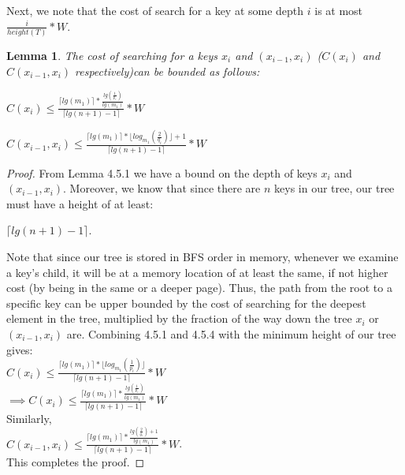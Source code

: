 \documentclass[letterpaper,12pt,titlepage,oneside,final]{book}
\theoremstyle{plain}
\newtheorem{lem}[thm]{Lemma}
\begin{document}
Next, we note that the cost of search for a key at some depth $i$ is at most $\frac{i}{height(T)}* W$.

\begin{lem}
The cost of searching for a keys $x_i$ and $(x_{i-1},x_i)$ ($C(x_i)$ and $C(x_{i-1},x_i)$ respectively)can be bounded as follows: 

\begin{center} $C(x_i) \leq \frac{\lceil lg(m_1) \rceil * \frac{lg(\frac{1}{p_i})}{lg(m_1)}}{\lceil lg(n+1) - 1 \rceil} * W$ 
\end{center}


\begin{center}
 $C(x_{i-1},x_i) \leq \frac{\lceil lg(m_1) \rceil * \lfloor log_{m_1}(\frac{2}{q_i}) \rfloor + 1}{\lceil lg(n+1) - 1 \rceil} * W$ 
 \end{center}
\end{lem}

\begin{proof}
From Lemma 4.5.1 we have a bound on the depth of keys $x_i$ and $(x_{i-1},x_i)$. Moreover, we know that since there are $n$ keys in our tree, our tree must have a height of at least:
\begin{center}
 $\lceil lg(n+1) - 1 \rceil$.
\end{center}
 Note that since our tree is stored in BFS order in memory, whenever we examine a key's child, it will be at a memory location of at least the same, if not higher cost (by being in the same or a deeper page). Thus, the path from the root to a specific key can be upper bounded by the cost of searching for the deepest element in the tree, multiplied by the fraction of the way down the tree $x_i$ or $(x_{i-1},x_i)$ are. Combining 4.5.1 and 4.5.4 with the minimum height of our tree gives: \\

 $C(x_i) \leq \frac{\lceil lg(m_1) \rceil * \lfloor log_{m_1}(\frac{1}{p_i}) \rfloor}{\lceil lg(n+1) - 1 \rceil} * W$  \\
 $\implies C(x_i) \leq \frac{\lceil lg(m_1) \rceil * \frac{lg(\frac{1}{p_i})}{lg(m_1)}}{\lceil lg(n+1) - 1 \rceil} * W$ \\
 
 Similarly, \\
 $C(x_{i-1},x_i) \leq \frac{\lceil lg(m_1) \rceil * \frac{lg(\frac{2}{q_i})+ 1}{lg(m_1)}}{\lceil lg(n+1) - 1 \rceil} * W$. \\ 
 This completes the proof. 
 


\end{proof}
\end{document}
